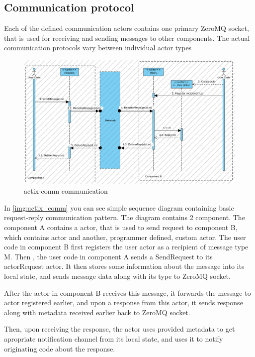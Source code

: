 \subsection{Communication protocol}
Each of the defined communication actors contains one primary ZeroMQ socket, that is used for receiving and sending messages
to other components. The actual communication protocols vary between individual actor types
\begin{figure}[H]
    \includegraphics[width=\textwidth]{obrazky-figures/actix-net communication.png}
    \caption{actix-comm communication}
    \label{img:actix_comm}
\end{figure}

In \autoref{img:actix_comm} you can see simple sequence diagram containing basic request-reply communication pattern.
The diagram contains 2 component. The component A contains a   actor, that is used to send request to component B,
which contains  actor and another, programmer defined, custom actor. The user code in component B first
registers the user actor as a recipient of message type M. Then , the user code in component A sends a SendRequest
to its actor{Request} actor. It then stores some information about the message into its local state, and sends message
data along with its type to ZeroMQ socket.

After the  actor in component B receives this message, it forwards the message to actor registered earlier,
and upon a response from this actor, it sends response along with metadata received earlier back to ZeroMQ socket.

Then, upon receiving the response, the  actor uses provided metadata to get apropriate notification
channel from its local state, and uses it to notify originating code about the response.

